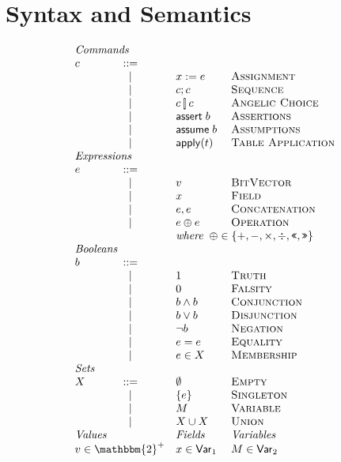 \section{Syntax and Semantics}


\begin{figure}[ht]
  \[\begin{array}{l c l l}
      \multicolumn{4}{l}{\textit{Commands}}\\
      c & ::=& \\
        & \mid & x := e & \textsc{Assignment}\\
        & \mid & c;c & \textsc{Sequence} \\
        & \mid & c \angel c & \textsc{Angelic Choice}\\
        & \mid & \assert b & \textsc{Assertions} \\
        & \mid & \assume b & \textsc{Assumptions} \\
        & \mid & \apply t & \textsc{Table Application}\\
      \multicolumn{4}{l}{\textit{Expressions}} \\
      e & ::= & \\
        & \mid & v            & \textsc{BitVector} \\
        & \mid & x            & \textsc{Field} \\
        & \mid & e,e          & \textsc{Concatenation} \\
        & \mid & e \oplus e   & \textsc{Operation} \\
        & &  \multicolumn{2}{l}{\textit{where}\;\; \oplus \in \{+,-,\times, \div, \texttt{<<}, \texttt{>>} \}} \\
      \multicolumn{4}{l}{\textit{Booleans}}\\
      b & ::= & \\
        & \mid & \TRUE & \textsc{Truth} \\
        & \mid & \FALSE & \textsc{Falsity} \\
        & \mid & b \wedge b & \textsc{Conjunction} \\
        & \mid & b \vee b & \textsc{Disjunction} \\
        & \mid & \neg b & \textsc{Negation} \\ 
        & \mid & e = e & \textsc{Equality} \\
        & \mid & e \in X & \textsc{Membership} \\
      \multicolumn 3 l{\textit{Sets}} \\
      X &::=& \emptyset & \textsc{Empty} \\
        & \mid & \{e\} & \textsc{Singleton}\\
        & \mid & M & \textsc{Variable} \\
        & \mid & X \cup X & \textsc{Union}\\
     \multicolumn{2}{l}{\textit{Values}} & \textit{Fields}  & \textit{Variables}\\
     \multicolumn{2}{l}{v \in \mathbbm{2}^+} & x \in \mathsf{Var}_1 & M \in \mathsf{Var}_2
    \end{array}\]


\end{figure}

